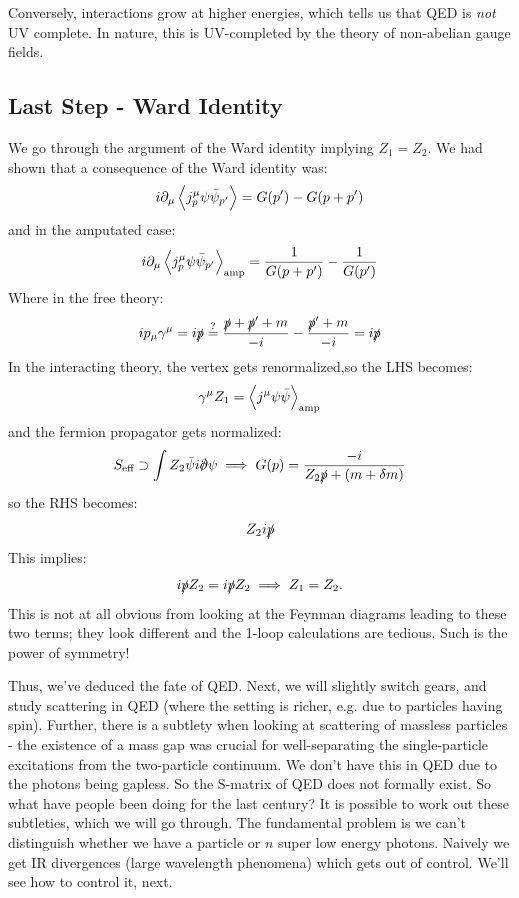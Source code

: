 Conversely, interactions grow at higher energies, which tells us that QED is \emph{not} UV complete. In nature, this is UV-completed by the theory of non-abelian gauge fields.

\subsection{Last Step - Ward Identity}
We go through the argument of the Ward identity implying $Z_1 = Z_2$. We had shown that a consequence of the Ward identity was:
\begin{equation}
    i\partial_\mu \left< j^\mu_p \psi \bar{\psi}_{p'} \right> = G(p') - G(p+p')
\end{equation}
and in the amputated case:
\begin{equation}
    i\partial_\mu \left< j^\mu_p \psi \bar{\psi}_{p'} \right>_{\text{amp}} = \frac{1}{G(p + p')} - \frac{1}{G(p')}
\end{equation}
Where in the free theory:
\begin{equation}
    ip_\mu \gamma^\mu = i\slashed{p} \stackrel{?}{=} \frac{\slashed{p} + \slashed{p}' + m}{-i} - \frac{\slashed{p}' + m}{-i} = i\slashed{p}
\end{equation}
In the interacting theory, the vertex gets renormalized,so the LHS becomes:
\begin{equation}
    \gamma^\mu Z_1 = \left< j^\mu \psi\bar{\psi} \right>_{\text{amp}}
\end{equation}
and the fermion propagator gets normalized:
\begin{equation}
    S_{\text{eff}} \supset \int Z_2\bar{\psi}i\slashed{\p}\psi \implies G(p) = \frac{-i}{Z_2\slashed{p} + (m + \delta m)}
\end{equation}
so the RHS becomes:
\begin{equation}
    Z_2i\slashed{p}
\end{equation}
This implies:
\begin{equation}
    i\slashed{p} Z_2 = i\slashed{p}Z_2 \implies Z_1 = Z_2.
\end{equation}
This is not at all obvious from looking at the Feynman diagrams leading to these two terms; they look different and the 1-loop calculations are tedious. Such is the power of symmetry!

Thus, we've deduced the fate of QED. Next, we will slightly switch gears, and study scattering in QED (where the setting is richer, e.g. due to particles having spin). Further, there is a subtlety when looking at scattering of massless particles - the existence of a mass gap was crucial for well-separating the single-particle excitations from the two-particle continuum. We don't have this in QED due to the photons being gapless. So the S-matrix of QED does not formally exist. So what have people been doing for the last century? It is possible to work out these subtleties, which we will go through. The fundamental problem is we can't distinguish whether we have a particle or $n$ super low energy photons. Naively we get IR divergences (large wavelength phenomena) which gets out of control. We'll see how to control it, next.